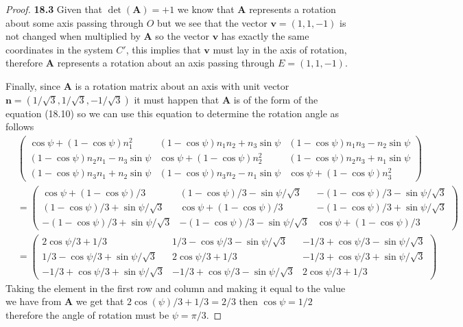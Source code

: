 \documentclass[11pt]{article}
\theoremstyle{definition}
\begin{document}
\begin{proof}{\textbf{18.3}}
    Given that $\det(\bm{A}) = +1$ we know that $\bm{A}$ represents a rotation
    about some axis passing through $O$ but we see that the vector
    $\bm{v} = (1, 1, -1)$ is not changed when multiplied by $\bm{A}$ so the
    vector $\bm{v}$ has exactly the same coordinates in the system $C'$, this
    implies that $\bm{v}$ must lay in the axis of rotation, therefore $\bm{A}$
    represents a rotation about an axis passing through $E = (1, 1, -1)$.

    Finally, since $\bm{A}$ is a rotation matrix about an axis with unit vector
    $\bm{n} = (1/\sqrt{3}, 1/\sqrt{3}, -1/\sqrt{3})$ it must happen that $\bm{A}$
    is of the form of the equation (18.10) so we can use this equation
    to determine the rotation angle as follows
    \begin{align*}
        &\begin{pmatrix}
            \cos\psi + (1-\cos\psi)n_1^2 & (1-\cos\psi)n_1n_2 + n_3\sin\psi & (1-\cos\psi)n_1n_3 - n_2\sin\psi\\
            (1-\cos\psi)n_2n_1 - n_3\sin\psi & \cos\psi + (1-\cos\psi)n_2^2  & (1-\cos\psi)n_2n_3 + n_1\sin\psi\\
            (1-\cos\psi)n_3n_1 + n_2\sin\psi & (1-\cos\psi)n_3n_2 - n_1\sin\psi & \cos\psi + (1-\cos\psi)n_3^2
        \end{pmatrix}\\
        &=\begin{pmatrix}
            \cos\psi + (1-\cos\psi)/3 &
            (1-\cos\psi)/3 -\sin\psi/\sqrt{3} &
            -(1-\cos\psi)/3 - \sin\psi/\sqrt{3}\\
            (1-\cos\psi)/3 + \sin\psi/\sqrt{3} &
            \cos\psi + (1-\cos\psi)/3 &
             -(1-\cos\psi)/3 + \sin\psi/\sqrt{3}\\
            -(1-\cos\psi)/3 + \sin\psi/\sqrt{3} &
            -(1-\cos\psi)/3 - \sin\psi/\sqrt{3} &
            \cos\psi + (1-\cos\psi)/3
        \end{pmatrix}\\
        &=\begin{pmatrix}
            2\cos\psi/3 + 1/3 &
            1/3-\cos\psi/3 -\sin\psi/\sqrt{3} &
            -1/3+\cos\psi/3 - \sin\psi/\sqrt{3}\\
            1/3-\cos\psi/3 + \sin\psi/\sqrt{3} &
            2\cos\psi/3 + 1/3 &
             -1/3 +\cos\psi/3 + \sin\psi/\sqrt{3}\\
            -1/3 +\cos\psi/3 + \sin\psi/\sqrt{3} &
            -1/3+\cos\psi/3 - \sin\psi/\sqrt{3} &
            2\cos\psi/3 + 1/3
        \end{pmatrix}
    \end{align*}
    Taking the element in the first row and column and making it equal to the
    value we have from $\bm{A}$ we get that $2\cos(\psi)/3 + 1/3 = 2/3$ then
    $\cos\psi= 1/2$ therefore the angle of rotation must be $\psi = \pi/3$.
\end{proof}
\end{document}
